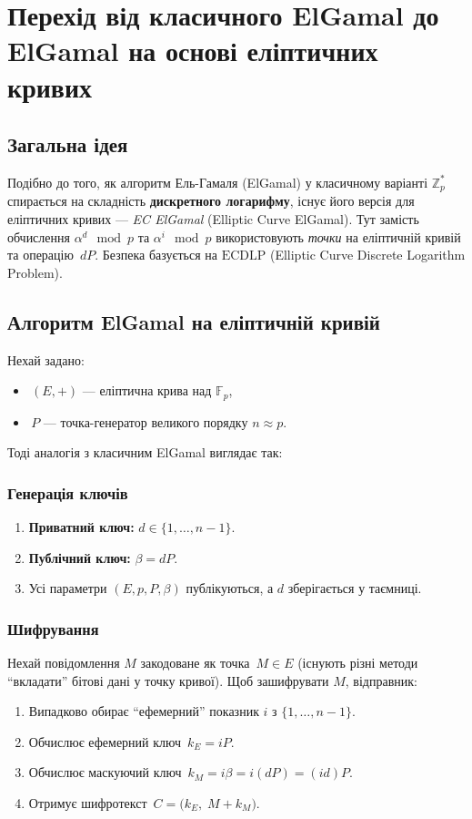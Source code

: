 \documentclass[12pt]{report}
\theoremstyle{definition}
\theoremstyle{plain}
\begin{document}
\chapter{Перехід від класичного ElGamal до ElGamal на основі еліптичних кривих}
\label{ch:ec_elgamal}

\section{Загальна ідея}

Подібно до того, як алгоритм Ель-Гамаля (ElGamal) у класичному варіанті 
\(\mathbb{Z}_p^*\) спирається на складність \textbf{дискретного логарифму}, 
існує його версія для еліптичних кривих — \textit{EC ElGamal} (Elliptic Curve ElGamal).  
Тут замість обчислення \(\alpha^d \mod p\) та \(\alpha^i \mod p\) використовують 
\textit{точки} на еліптичній кривій та операцію \(\,dP\). Безпека базується на 
\(\text{ECDLP}\) (Elliptic Curve Discrete Logarithm Problem).  

\section{Алгоритм ElGamal на еліптичній кривій}

Нехай задано:
\begin{itemize}
    \item \(\,(E, +)\) — еліптична крива над \(\mathbb{F}_p\),  
    \item \(\,P\) — точка-генератор великого порядку \(n \approx p\).  
\end{itemize}

Тоді аналогія з класичним ElGamal виглядає так:

\subsection{Генерація ключів}
\begin{enumerate}
    \item \textbf{Приватний ключ:} \(d \in \{1,\ldots, n-1\}\).  
    \item \textbf{Публічний ключ:} \(\beta = dP\).  
    \item Усі параметри \((E, p, P, \beta)\) публікуються, а \(d\) зберігається у таємниці.
\end{enumerate}

\subsection{Шифрування}
Нехай повідомлення \(M\) закодоване як точка \(\,M \in E\) 
(існують різні методи ``вкладати'' бітові дані у точку кривої).  
Щоб зашифрувати \(M\), відправник:
\begin{enumerate}
    \item Випадково обирає ``ефемерний'' показник \(i\) з \(\{1,\ldots, n-1\}\).
    \item Обчислює ефемерний ключ \(\,k_E = iP\).
    \item Обчислює маскуючий ключ \(\,k_M = i\beta = i(dP) = (id)P\).
    \item Отримує шифротекст \(\,C = \bigl( k_E,\; M + k_M \bigr)\).
\end{enumerate}
\end{document}
